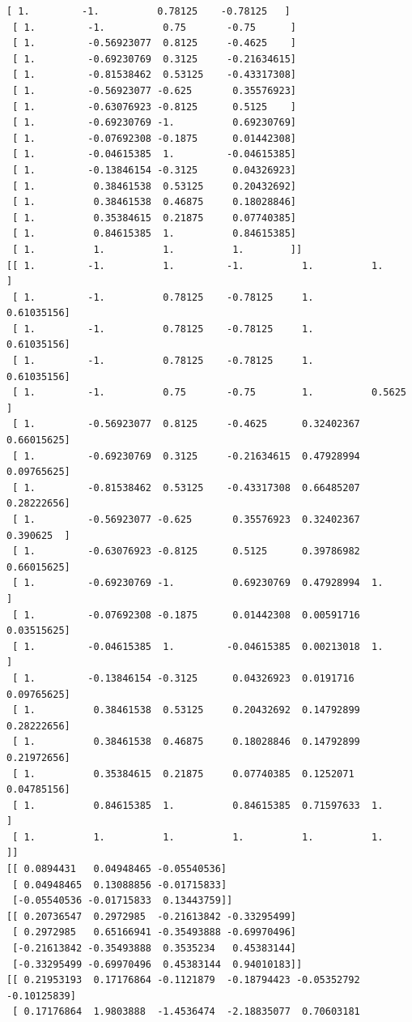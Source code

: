 \documentclass[a4paper,11pt,final]{article}
\begin{document}
\begin{Verbatim}[commandchars=\\\{\},frame=leftline,fontsize=\small, xleftmargin=0.5em]
 [ 1.         -1.          0.78125    -0.78125   ]
 [ 1.         -1.          0.75       -0.75      ]
 [ 1.         -0.56923077  0.8125     -0.4625    ]
 [ 1.         -0.69230769  0.3125     -0.21634615]
 [ 1.         -0.81538462  0.53125    -0.43317308]
 [ 1.         -0.56923077 -0.625       0.35576923]
 [ 1.         -0.63076923 -0.8125      0.5125    ]
 [ 1.         -0.69230769 -1.          0.69230769]
 [ 1.         -0.07692308 -0.1875      0.01442308]
 [ 1.         -0.04615385  1.         -0.04615385]
 [ 1.         -0.13846154 -0.3125      0.04326923]
 [ 1.          0.38461538  0.53125     0.20432692]
 [ 1.          0.38461538  0.46875     0.18028846]
 [ 1.          0.35384615  0.21875     0.07740385]
 [ 1.          0.84615385  1.          0.84615385]
 [ 1.          1.          1.          1.        ]]
[[ 1.         -1.          1.         -1.          1.          1.
]
 [ 1.         -1.          0.78125    -0.78125     1.
0.61035156]
 [ 1.         -1.          0.78125    -0.78125     1.
0.61035156]
 [ 1.         -1.          0.78125    -0.78125     1.
0.61035156]
 [ 1.         -1.          0.75       -0.75        1.          0.5625
]
 [ 1.         -0.56923077  0.8125     -0.4625      0.32402367
0.66015625]
 [ 1.         -0.69230769  0.3125     -0.21634615  0.47928994
0.09765625]
 [ 1.         -0.81538462  0.53125    -0.43317308  0.66485207
0.28222656]
 [ 1.         -0.56923077 -0.625       0.35576923  0.32402367
0.390625  ]
 [ 1.         -0.63076923 -0.8125      0.5125      0.39786982
0.66015625]
 [ 1.         -0.69230769 -1.          0.69230769  0.47928994  1.
]
 [ 1.         -0.07692308 -0.1875      0.01442308  0.00591716
0.03515625]
 [ 1.         -0.04615385  1.         -0.04615385  0.00213018  1.
]
 [ 1.         -0.13846154 -0.3125      0.04326923  0.0191716
0.09765625]
 [ 1.          0.38461538  0.53125     0.20432692  0.14792899
0.28222656]
 [ 1.          0.38461538  0.46875     0.18028846  0.14792899
0.21972656]
 [ 1.          0.35384615  0.21875     0.07740385  0.1252071
0.04785156]
 [ 1.          0.84615385  1.          0.84615385  0.71597633  1.
]
 [ 1.          1.          1.          1.          1.          1.
]]
[[ 0.0894431   0.04948465 -0.05540536]
 [ 0.04948465  0.13088856 -0.01715833]
 [-0.05540536 -0.01715833  0.13443759]]
[[ 0.20736547  0.2972985  -0.21613842 -0.33295499]
 [ 0.2972985   0.65166941 -0.35493888 -0.69970496]
 [-0.21613842 -0.35493888  0.3535234   0.45383144]
 [-0.33295499 -0.69970496  0.45383144  0.94010183]]
[[ 0.21953193  0.17176864 -0.1121879  -0.18794423 -0.05352792
-0.10125839]
 [ 0.17176864  1.9803888  -1.4536474  -2.18835077  0.70603181

\end{Verbatim}
\end{document}
